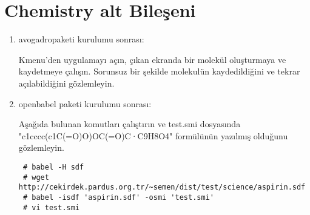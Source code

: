 \documentclass[a4paper,10pt]{article}
\begin{document}
\section{Chemistry alt Bileşeni}
\begin{enumerate}
 \item avogadropaketi kurulumu sonrası:

Kmenu'den uygulamayı açın, çıkan ekranda bir molekül oluşturmaya ve kaydetmeye çalışın. Sorunsuz bir şekilde molekulün kaydedildiğini ve tekrar açılabildiğini gözlemleyin.

 \item openbabel paketi kurulumu sonrası:

Aşağıda bulunan komutları çalıştırın ve test.smi dosyasında "c1cccc(c1C(=O)O)OC(=O)C·C9H8O4" formülünün yazılmış olduğunu gözlemleyin.
\begin{verbatim}
 # babel -H sdf
 # wget http://cekirdek.pardus.org.tr/~semen/dist/test/science/aspirin.sdf
 # babel -isdf 'aspirin.sdf' -osmi 'test.smi'
 # vi test.smi
\end{verbatim}

\end{enumerate}
\end{document}
